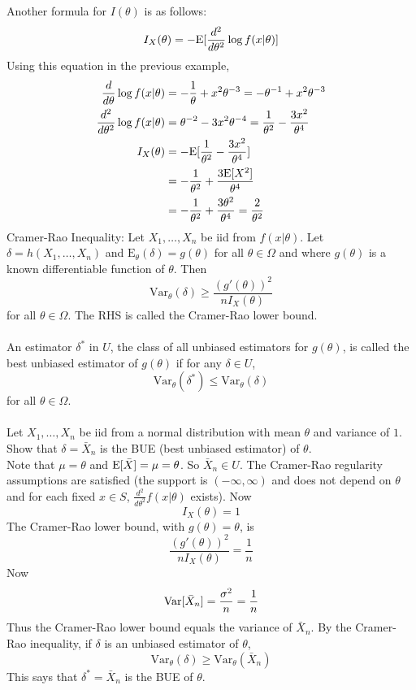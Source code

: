 \documentclass[12pt]{article}
\begin{document}
Another formula for $I(\theta)$ is as follows: $$ I_X(\theta) = -\mathrm{E}[ \frac{d^2}{d\theta^2} \log f(x | \theta) ] $$ 
Using this equation in the previous example, $$ \begin{aligned} \frac{d}{d\theta} \log f(x | \theta) &= -\frac{1}{\theta} + x^2\theta^{-3} = -\theta^{-1} + x^2\theta^{-3} \\ \frac{d^2}{d\theta^2} \log f(x | \theta) &= \theta^{-2} - 3x^2\theta^{-4} = \frac{1}{\theta^2} - \frac{3x^2}{\theta^4} \\ I_X(\theta) &= -\mathrm{E}[  \frac{1}{\theta^2} - \frac{3x^2}{\theta^4} ] \\ &= -\frac{1}{\theta^2} + \frac{3\mathrm{E}[ X^2 ]}{\theta^4} \\ &= -\frac{1}{\theta^2} + \frac{3\theta^2}{\theta^4} = \frac{2}{\theta^2} \end{aligned} $$ 
Cramer-Rao Inequality: Let $X_1,\dots,X_n$ be iid from $f(x | \theta)$. Let $\delta = h(X_1,\dots,X_n)$ and $\mathrm{E}_\theta(\delta) = g(\theta)$ for all $\theta \in \Omega$ and where $g(\theta)$ is a known differentiable function of $\theta$. Then $$ \mathrm{Var}_\theta(\delta) \geq \frac{(g'(\theta))^2}{nI_X(\theta)} $$ for all $\theta \in \Omega$. The RHS is called the Cramer-Rao lower bound. \\~\\ 
An estimator $\delta^*$ in $U$, the class of all unbiased estimators for $g(\theta)$, is called the best unbiased estimator of $g(\theta)$ if for any $\delta \in U$, $$ \mathrm{Var}_\theta(\delta^*) \leq \mathrm{Var}_\theta(\delta) $$ for all $\theta \in \Omega$. \\~\\
Let $X_1,\dots,X_n$ be iid from a normal distribution with mean $\theta$ and variance of $1$. Show that $\delta = \bar{X}_n$ is the BUE (best unbiased estimator) of $\theta$. \\ Note that $\mu = \theta$ and $\mathrm{E}[ \bar{X} ] = \mu = \theta$. So $\bar{X}_n \in U$. The Cramer-Rao regularity assumptions are satisfied (the support is $(-\infty, \infty)$ and does not depend on $\theta$ and for each fixed $x \in S$, $\frac{d^2}{d\theta^2} f(x | \theta)$ exists). Now $$I_X(\theta) = 1$$ The Cramer-Rao lower bound, with $g(\theta) = \theta$, is $$ \frac{(g'(\theta))^2}{nI_X(\theta)} = \frac{1}{n} $$ Now $$\mathrm{Var}[ \bar{X}_n ] = \frac{\sigma^2}{n} = \frac{1}{n} $$ Thus the Cramer-Rao lower bound equals the variance of $\bar{X}_n$. By the Cramer-Rao inequality, if $\delta$ is an unbiased estimator of $\theta$, $$ \mathrm{Var}_\theta(\delta) \geq \mathrm{Var}_\theta(\bar{X}_n) $$ This says that $\delta^* = \bar{X}_n$ is the BUE of $\theta$. \\~\\ 
\end{document}
